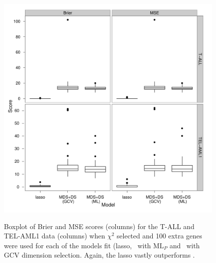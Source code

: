 \begin{figure}
\centering
\includegraphics[width=6in]{gds/figs/confsim-msebrier.pdf} \\
\caption{Boxplot of Brier and MSE scores (columns) for the T-ALL and TEL-AML1 data (columns) when $\chi^2$ selected and 100 extra genes were used for each of the models fit (lasso, \mdsds\ with $\text{ML}_P$ and \mdsds\ with GCV dimension selection. Again, the lasso vastly outperforms \mdsds.}
\label{leuk-confsim-boxplot}
\end{figure}

